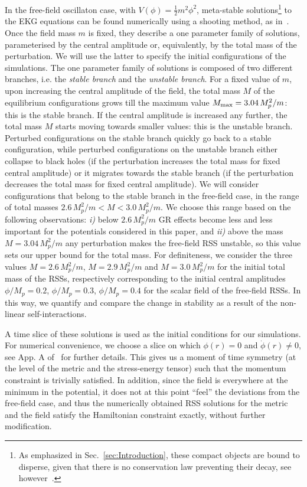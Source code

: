 \documentclass[11pt,a4paper]{article}
\begin{document}
In the free-field oscillaton case, with $V(\phi) = \frac{1}{2} m^2 \phi^2$, meta-stable solutions\footnote{As emphasized in Sec.~\ref{sec:Introduction}, these compact objects are bound to disperse, given that there is no conservation law preventing their decay, see however~\cite{Gleiser:1999tj, Salmi:2012ta, Gleiser:2008ty, Saffin:2006yk, Gleiser:2019rvw}.} to the EKG equations can be found numerically using a shooting method, as in~\cite{Alcubierre:2003sx,UrenaLopez:2002gx,UrenaLopez:2001tw}. Once the field mass $m$ is fixed, they describe a one parameter family of solutions, parameterised by the central amplitude or, equivalently, by the total mass of the perturbation. We will use the latter to specify the initial configurations of the simulations. The one parameter family of solutions is composed of two different branches, i.e. the \textit{stable branch} and the \textit{unstable branch}. For a fixed value of $m$, upon increasing the central amplitude of the field, the total mass $M$ of the equilibrium configurations grows till the maximum value $M_{\rm max} = 3.04 \, M_p^2/m$: this is the stable branch. If the central amplitude is increased any further, the total mass $M$ starts moving towards smaller values: this is the unstable branch. Perturbed configurations on the stable branch quickly go back to a stable configuration, while perturbed configurations on the unstable branch either collapse to black holes (if the perturbation increases the total mass for fixed central amplitude) or it migrates towards the stable branch (if the perturbation decreases the total mass for fixed central amplitude). We will consider configurations that belong to the stable branch in the free-field case, in the range of total masses $2.6 \, M_p^2/m < M < 3.0 \,M_p^2/m$. We choose this range based on the following observations: \textit{i)} below $2.6 \, M_p^2/m$ GR effects become less and less important for the potentials considered in this paper, and \textit{ii)} above the mass $M = 3.04 \, M_p^2/m$ any perturbation makes the free-field RSS unstable, so this value sets our upper bound for the total mass. For definiteness, we consider the three values $M = 2.6 \, M_p^2/m$, $M = 2.9 \, M_p^2/m$ and $M = 3.0 \, M_p^2/m$ for the initial total mass of the RSSs, respectively corresponding to the initial central amplitudes $\phi/M_p = 0.2$, $\phi/M_p = 0.3$, $\phi/M_p = 0.4$ for the scalar field of the free-field RSSs. In this way, we quantify and compare the change in stability as a result of the non-linear self-interactions.

A time slice of these solutions is used as the initial conditions for our simulations. For numerical convenience, we choose a slice on which $\phi(r) = 0$ and $\dot \phi(r) \neq 0$, see App. A of~\cite{Helfer:2016ljl} for further details. This gives us a moment of time symmetry (at the level of the metric and the stress-energy tensor) such that the momentum constraint is trivially satisfied. In addition, since the field is everywhere at the minimum in the potential, it does not at this point ``feel'' the deviations from the free-field case, and thus the numerically obtained RSS solutions for the metric and the field satisfy the Hamiltonian constraint exactly, without further modification.
\end{document}
